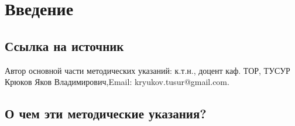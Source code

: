 \chapter{Введение}
\section{Ссылка на источник}
Автор основной части методических указаний: к.т.н., доцент каф. ТОР, ТУСУР Крюков Яков Владимирович,Email: kryukov.tusur@gmail.com.
\section{О чем эти методические указания?}
\endinput